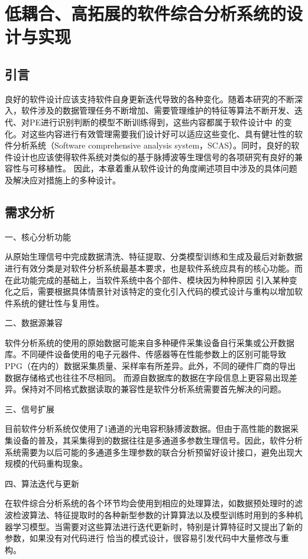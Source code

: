 \chapter{低耦合、高拓展的软件综合分析系统的设计与实现}
\section{引言}
良好的软件设计应该支持软件自身更新迭代导致的各种变化\cite{Enrich2018}。随着本研究的不断深入，软件涉及的数据管理任务不断增加、需要管理维护的特征等算法不断开发、迭代、对PE进行识别判断的模型不断训练得到，这些内容都属于软件设计中
的变化。对这些内容进行有效管理需要我们设计好可以适应这些变化、具有健壮性的软件分析系统（Software comprehensive analysis system，SCAS）。同时，良好的软件设计也应该使得软件系统对类似的基于脉搏波等生理信号的各项研究有良好的兼容性与可移植性。
因此，本章着重从软件设计的角度阐述项目中涉及的具体问题及解决应对措施上的多种设计。

\section{需求分析}
一、核心分析功能

从原始生理信号中完成数据清洗、特征提取、分类模型训练和生成及最后对新数据进行有效分类是对软件分析系统最基本要求，也是软件系统应具有的核心功能。而在此功能完成的基础上，当软件系统中各个部件、模块因为种种原因
引入某种变化之后，需要根据具体情景针对该特定的变化引入代码的模式设计与重构以增加软件系统的健壮性与复用性。

二、数据源兼容

软件分析系统的使用的原始数据可能来自多种硬件采集设备自行采集或公开数据库。不同硬件设备使用的电子元器件、传感器等在性能参数上的区别可能导致PPG（在内的）数据采集质量、采样率有所差异。此外，不同的硬件厂商的导出数据存储格式也往往不尽相同。
而源自数据库的数据在字段信息上更容易出现差异。保持对不同格式数据读取的兼容性是软件分析系统需要首先解决的问题。

三、信号扩展

目前软件分析系统仅使用了1通道的光电容积脉搏波数据。但由于高性能的数据采集设备的普及，其采集得到的数据往往是多通道多参数生理信号。因此，软件分析系统需要为以后可能的多通道多生理参数的联合分析预留好设计接口，避免出现大规模的代码重构现象。

四、算法迭代与更新

在软件综合分析系统的各个环节均会使用到相应的处理算法，如数据预处理时的滤波检波算法、特征提取时的各种新型参数的计算算法以及模型训练时用到的多种机器学习模型。当需要对这些算法进行迭代更新时，特别是计算特征时又提出了新的参数，如果没有对代码进行
恰当的模式设计，很容易引发代码中大量修改与重构。

